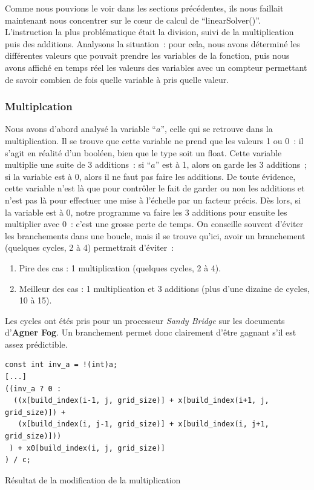 \documentclass[12pt,a4paper]{article}
\begin{document}
Comme nous pouvions le voir dans les sections précédentes, ils nous faillait
maintenant nous concentrer sur le cœur de calcul de \enquote{linearSolver()}.
L’instruction la plus problématique était la division, suivi de la
multiplication puis des additions. Analysons la situation : pour cela, nous
avons déterminé les différentes valeurs que pouvait prendre les variables de la
fonction, puis nous avons affiché en temps réel les valeurs des variables avec
un compteur permettant de savoir combien de fois quelle variable à pris quelle
valeur.

\subsubsection{Multiplcation}
\label{sub.optim.calc.mul}

Nous avons d’abord analysé la variable \enquote{$a$}, celle qui se retrouve dans
la multiplication. Il se trouve que cette variable ne prend que les valeurs 1 ou
0 : il s’agit en réalité d’un booléen, bien que le type soit un float. Cette
variable multiplie une suite de 3 additions : si \enquote{$a$} est à 1, alors on
garde les 3 additions ; si la variable est à 0, alors il ne faut pas faire les
additions. De toute évidence, cette variable n’est là que pour contrôler le fait
de garder ou non les additions et n’est pas là pour effectuer une mise à
l’échelle par un facteur précis. Dès lors, si la variable est à 0, notre
programme va faire les 3 additions pour ensuite les multiplier avec 0 : c’est
une grosse perte de temps. On conseille souvent d’éviter les branchements dans
une boucle, mais il se trouve qu’ici, avoir un branchement (quelques cycles, 2 à
4) permettrait d’éviter :
\begin{enumerate}
    \item Pire des cas : 1 multiplication (quelques cycles, 2 à 4).
    \item Meilleur des cas : 1 multiplication et 3 additions (plus d’une
        dizaine de cycles, 10 à 15).
\end{enumerate}
Les cycles ont étés pris pour un processeur \textit{Sandy Bridge} sur les
documents d’\textbf{Agner Fog}. Un branchement permet donc clairement d’être
gagnant s’il est assez prédictible.

\begin{listing}
    \begin{verbatim}
const int inv_a = !(int)a;
[...]
((inv_a ? 0 :
  ((x[build_index(i-1, j, grid_size)] + x[build_index(i+1, j, grid_size)]) +
   (x[build_index(i, j-1, grid_size)] + x[build_index(i, j+1, grid_size)]))
 ) + x0[build_index(i, j, grid_size)]
) / c;
    \end{verbatim}
    \caption{Résultat de la modification de la multiplication}
    \label{lst.optim.calc.mul}
\end{listing}
\end{document}
